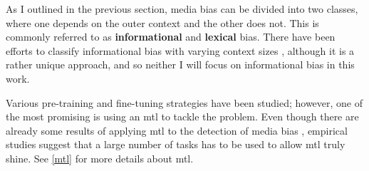 As I outlined in the previous section, media bias can be divided into two classes, where one depends on the outer context and the other does not. This is commonly referred to as \textbf{informational} and \textbf{lexical} bias. There have been efforts to classify informational bias with varying context sizes \cite{van2020context}, although it is a rather unique approach, and so neither I will focus on informational bias in this work.

Various pre-training and fine-tuning strategies have been studied; however, one of the most promising is using an \Gls{mtl} to tackle the problem. Even though there are already some results of applying \Gls{mtl} to the detection of media bias \cite{lee2021unifying,spindeexploiting}, empirical studies suggest that a large number of tasks has to be used to allow \Gls{mtl} truly shine. See \ref{mtl} for more details about \gls{mtl}. 